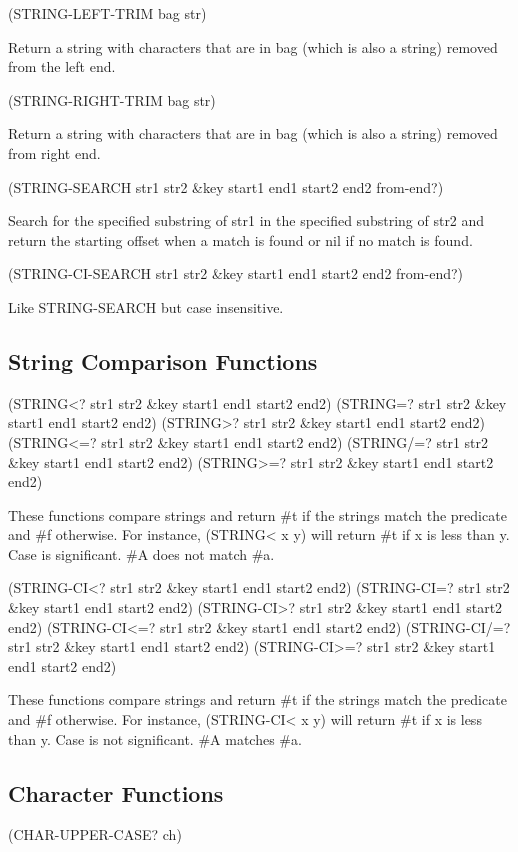 \documentclass[11pt]{article}
\begin{document}
(STRING-LEFT-TRIM bag str)

Return a string with characters that are in bag (which is also a string)
removed from the left end.

(STRING-RIGHT-TRIM bag str)

Return a string with characters that are in bag (which is also a string)
removed from right end.

(STRING-SEARCH str1 str2 \&key start1 end1 start2 end2 from-end?)

Search for the specified substring of str1 in the specified substring of
str2 and return the starting offset when a match is found or nil if no
match is found.

(STRING-CI-SEARCH str1 str2 \&key start1 end1 start2 end2 from-end?)

Like STRING-SEARCH but case insensitive.
\subsection{String Comparison Functions}
\label{sec-1-31}

(STRING<? str1 str2 \&key start1 end1 start2 end2)
(STRING=? str1 str2 \&key start1 end1 start2 end2)
(STRING>? str1 str2 \&key start1 end1 start2 end2)
(STRING<=? str1 str2 \&key start1 end1 start2 end2)
(STRING/=? str1 str2 \&key start1 end1 start2 end2)
(STRING>=? str1 str2 \&key start1 end1 start2 end2)

These functions compare strings and return \#t if the strings match the
predicate and \#f otherwise. For instance, (STRING< x y) will return \#t
if x is less than y. Case is significant. \#A does not match \#a.

(STRING-CI<? str1 str2 \&key start1 end1 start2 end2)
(STRING-CI=? str1 str2 \&key start1 end1 start2 end2)
(STRING-CI>? str1 str2 \&key start1 end1 start2 end2)
(STRING-CI<=? str1 str2 \&key start1 end1 start2 end2)
(STRING-CI/=? str1 str2 \&key start1 end1 start2 end2)
(STRING-CI>=? str1 str2 \&key start1 end1 start2 end2)

These functions compare strings and return \#t if the strings match the
predicate and \#f otherwise. For instance, (STRING-CI< x y) will
return \#t if x is less than y. Case is not significant. \#A matches \#a.
\subsection{Character Functions}
\label{sec-1-32}

(CHAR-UPPER-CASE? ch)
\end{document}
